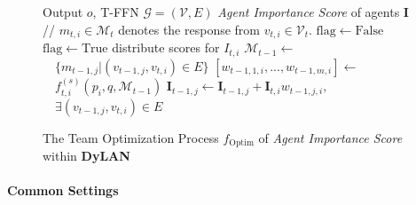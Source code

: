 \documentclass{article} %
\begin{document}
\begin{figure}[htb]
\begin{minipage}[t]{.57\linewidth}
\begin{algorithm}[H]
\begin{algorithmic}
\end{algorithmic}
\end{algorithm}
  \end{minipage}
  \hfill
  \begin{minipage}[t]{.415\linewidth}
\begin{algorithm}[H]
\caption{The Team Optimization Process $f_{\mathrm{Optim}}$ of \textit{Agent Importance Score} within \textbf{DyLAN}}\label{alg:evaluate}
\begin{algorithmic}
 Output $o$, T-FFN $\mathcal{G}=(\mathcal{V}, E)$
 \textit{Agent Importance Score} of agents $\bm{I}$
\STATE // $m_{t,i} \in \mathcal{M}_t$ denotes the response from $v_{t,i}\in\mathcal{V}_t$.
\STATE $\mathrm{flag} \gets \mathrm{False}$\;
\STATE $\mathrm{flag} \gets \mathrm{True}$\;
\STATE distribute scores for $I_{t,i}$\;
\ELSE
\STATE $\mathcal{M}_{t-1} \gets$ \;
\STATE $\quad  \{m_{t-1,j} | (v_{t-1,j}, v_{t,i})\in E\}$\;
\STATE $[w_{t-1,1,i}, ..., w_{t-1,m,i}] \gets $ \;
\STATE $\quad f_{t,i}^{(s)}(p_i, q, \mathcal{M}_{t-1})$\;
\STATE $\bm{I}_{t-1,j} \gets \bm{I}_{t-1,j} + \bm{I}_{t,i} w_{t-1,j,i},  $\;
\STATE $\quad  \exists (v_{t-1,j}, v_{t,i})\in E$\;
\ENDIF
\ENDIF
\ENDFOR


\end{algorithmic}
\end{algorithm}
  \end{minipage}

\end{figure}

\paragraph{Common Settings}
\end{document}
